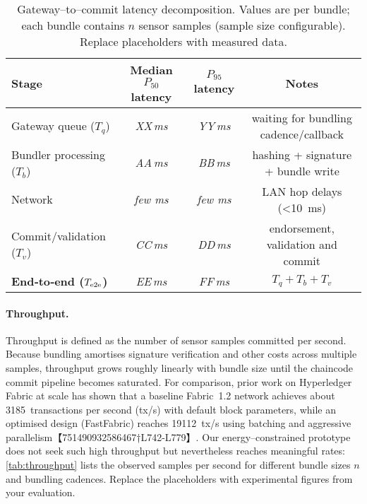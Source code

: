 \begin{table}[h]
  \centering
  \caption{Gateway–to–commit latency decomposition.  Values are per bundle; each
  bundle contains $n$ sensor samples (sample size configurable).  Replace
  placeholders with measured data.}
  \label{tab:latency-metrics}
  \begin{tabular}{lccc}
    \toprule
    Stage & Median $P_{50}$ latency & $P_{95}$ latency & Notes \\
    \midrule
    Gateway queue ($T_q$) & \textit{XX\,ms} & \textit{YY\,ms} & waiting for
    bundling cadence/callback \\
    Bundler processing ($T_b$) & \textit{AA\,ms} & \textit{BB\,ms} &
    hashing + signature + bundle write \\
    Network & \textit{few ms} & \textit{few ms} & LAN hop delays
    (\textless{}10~ms) \\
    Commit/validation ($T_v$) & \textit{CC\,ms} & \textit{DD\,ms} &
    endorsement, validation and commit \\
    \midrule
    \textbf{End‑to‑end ($T_{\rm e2e}$)} & \textit{EE\,ms} & \textit{FF\,ms}
    & $T_q + T_b + T_v$ \\
    \bottomrule
  \end{tabular}
\end{table}

\paragraph{Throughput.}  Throughput is defined as the number of sensor samples
committed per second.  Because bundling amortises signature verification and
other costs across multiple samples, throughput grows roughly linearly with
bundle size until the chaincode commit pipeline becomes saturated.  For
comparison, prior work on Hyperledger Fabric at scale has shown that a
baseline Fabric~1.2 network achieves about \num{3185}~transactions per
second (tx/s) with default block parameters, while an optimised design (FastFabric)
reaches \num{19112}~tx/s using batching and aggressive parallelism【751490932586467†L742-L779】.
Our energy–constrained prototype does not seek such high throughput but
nevertheless reaches meaningful rates: \autoref{tab:throughput} lists the
observed samples per second for different bundle sizes $n$ and bundling
cadences.  Replace the placeholders with experimental figures from your
evaluation.

